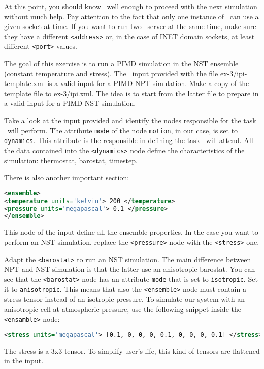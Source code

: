 \documentclass{article}
\begin{document}
At this point, you should know \ipi\ well enough to
proceed with the next simulation without much help. Pay attention to
the fact that only one instance of \ipi\ can use a given socket at
time. If you want to run two \ipi\ server at the same time, make sure
they have a different \texttt{<address>} or, in the case of INET domain
sockets, at least different \texttt{<port>} values. 

\vspace{2em}

\begin{Exercise}[label={inputs},title={PIMD-NPT simulation of ice}]
  The goal of this exercise is to run a PIMD simulation in the NST
  ensemble (constant temperature and stress). The \ipi\ input provided
  with the file \url{ex-3/ipi-template.xml} is a valid input for a
  PIMD-NPT simulation. Make a copy of the template file to
  \url{ex-3/ipi.xml}. The idea is to start from the latter file to
  prepare in a valid input for a PIMD-NST simulation.

\Question 
Take a look at the input provided and identify the nodes
responsible for the task \ipi\ will perform.  The attribute
\texttt{mode} of the node \texttt{motion}, in our case, is set to
\texttt{dynamics}. This attribute is the responsible in defining the
task \ipi\ will attend. All the data contained into the
\texttt{<dynamics>} node define the characteristics of the simulation:
thermostat, barostat, timestep. 

There is also another important section:
\begin{lstlisting}[language=xml]
<ensemble>
<temperature units='kelvin'> 200 </temperature>
<pressure units='megapascal'> 0.1 </pressure>
</ensemble>
\end{lstlisting}
This node of the input define all the ensemble properties. In the
case you want to perform an NST simulation, replace the
\texttt{<pressure>} node with the \texttt{<stress>} one. 

\Question 
Adapt the \texttt{<barostat>} to run an NST simulation. The
main difference between NPT and NST simulation is that the latter use
an anisotropic barostat. You can see that the \texttt{<barostat>} node
has an attribute \texttt{mode} that is set to \texttt{isotropic}. Set
it to \texttt{anisotropic}.  This means that also the
\texttt{<ensemble>} node must contain a stress tensor instead of an
isotropic pressure. To simulate our system with an anisotropic cell at
atmospheric pressure, use the following snippet inside the
\texttt{<ensamble>} node:
\begin{lstlisting}[language=xml]
<stress units='megapascal'> [0.1, 0, 0, 0, 0.1, 0, 0, 0, 0.1] </stress>
\end{lstlisting}
The stress is a 3x3 tensor. To simplify user's life, this kind of tensors are
flattened in the \ipi input.


\end{Exercise}
\end{document}
